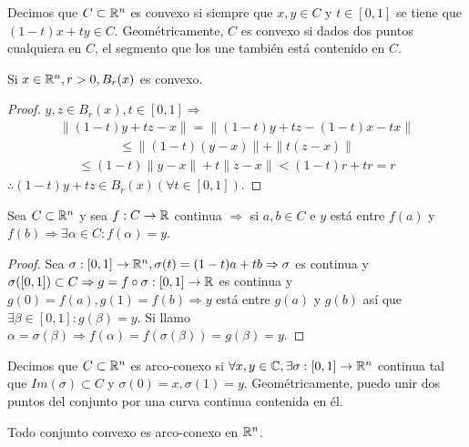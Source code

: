 \begin{definition}[Convexidad]
  Decimos que $C \subset \mathbb{R}^n$ es convexo si siempre que $x, y \in C$ y $t \in [0, 1]$ se tiene que $(1-t)x+ty \in C$. Geométricamente, $C$ es convexo si dados dos puntos cualquiera en $C$, el segmento que los une también está contenido en $C$.
\end{definition}

\begin{eg}
  Si $x \in \mathbb{R}^n, r > 0, B_r(x)$ es convexo.
  \begin{proof}
    $y, z \in B_r(x), t \in [0,1] \Rightarrow$ \begin{align*} \|(1-t)y+tz - x\| = \| (1-t)y + tz - (1-t)x - tx \| \end{align*} \begin{align*} \leq \|(1 -t) (y-x) \| + \|t(z-x)\| \end{align*}
    \begin{align*} \leq (1-t) \|y-x\| + t \|z-x\| < (1-t)r + tr = r \end{align*} $\therefore (1-t)y + tz \in B_r(x) (\forall t \in [0, 1])$.
  \end{proof}
\end{eg}

\begin{prop}
  Sea $C \subset \mathbb{R}^n$ y sea $f : C \to \mathbb{R}$ continua $\Rightarrow$ si $a, b \in C$ e $y$ está entre $f(a)$ y $f(b) \Rightarrow \exists \alpha \in C : f(\alpha) = y$.
  \begin{proof}
    Sea $\sigma: [0, 1] \to \mathbb{R}^n, \sigma(t) = (1-t)a+tb \Rightarrow \sigma$ es continua y $\sigma([0, 1]) \subset C \Rightarrow g = f \circ \sigma: [0, 1] \to \mathbb{R}$ es continua y $g(0) = f(a), g(1) = f(b) \Rightarrow y$ está entre $g(a)$ y $g(b)$ así que $\exists \beta \in [0, 1] : g(\beta) = y$. Si llamo $\alpha = \sigma(\beta) \Rightarrow f(\alpha) = f(\sigma(\beta)) = g(\beta) = y$.
  \end{proof}
\end{prop}

\begin{definition}
  Decimos que $C \subset \mathbb{R}^n$ es arco-conexo si $\forall x, y \in \mathbb{C}, \exists \sigma: [0, 1] \to \mathbb{R}^n$ continua tal que $Im(\sigma) \subset C$ y $\sigma(0) = x, \sigma(1) = y$. Geométricamente, puedo unir dos puntos del conjunto por una curva continua contenida en él.
\end{definition}

\begin{note}
  Todo conjunto convexo es arco-conexo en $\mathbb{R}^n$.
\end{note}

